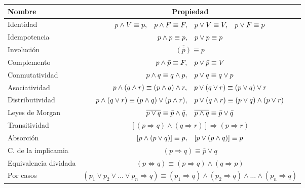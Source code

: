 \begingroup
\setlength{\tabcolsep}{6pt} %
\renewcommand{\arraystretch}{1.5} %
\begin{center}
\begin{tabular}{l|c}
\bf Nombre&\bf Propiedad\\ \hline
Identidad& $p \wedge V \equiv p, \hspace{0.3cm} p \wedge F \equiv F, \hspace{0.3cm} p \vee V \equiv V, \hspace{0.3cm} p \vee F \equiv p  $\\
Idempotencia& $p \wedge p \equiv p,\hspace{0.3cm} p \vee p \equiv p $\\
Involución& $\overline{( {\overline{p}} )} \equiv p$\\
Complemento&$p \wedge \bar{p} \equiv F,\hspace{0.3cm} p \vee \bar{p} \equiv V$\\
Conmutatividad&$ p \wedge q \equiv q \wedge p, \hspace{0.3cm} p \vee q \equiv q \vee p $\\
Asociatividad&$ p \wedge (q \wedge r) \equiv (p \wedge q) \wedge r, \hspace{0.3cm} p \vee (q \vee r) \equiv (p \vee q) \vee r$\\
Distributividad&$p \wedge (q \vee r) \equiv (p \wedge q) \vee (p \wedge r), \hspace{0.3cm}  p \vee (q \wedge r) \equiv (p \vee q) \wedge (p \vee r) $\\
Leyes de Morgan&$\overline{p \vee q} \equiv \bar{p} \wedge \bar{q}, \hspace{0.3cm} \overline{p \wedge q} \equiv \bar{p} \vee \bar{q}$\\
Transitividad&$[(p \Rightarrow q) \wedge (q \Rightarrow r)] \Rightarrow (p \Rightarrow r)$\\
Absorción&$[p \wedge ( p \vee q )] \equiv p, \hspace{0.3cm} [p \vee (p \wedge q)] \equiv p$\\
C. de la implicamia& $(p \Rightarrow q) \equiv \bar{p} \vee q$\\
Equivalencia dividada& $(p \Leftrightarrow q) \equiv (p \Rightarrow q) \wedge (q \Rightarrow p)$\\
Por casos& $(p_1 \vee p_2 \vee \dots \vee p_n \Rightarrow q) \equiv (p_1 \Rightarrow q) \wedge (p_2 \Rightarrow q) \wedge \dots \wedge (p_n \Rightarrow q)$
\end{tabular}

\end{center}
\endgroup